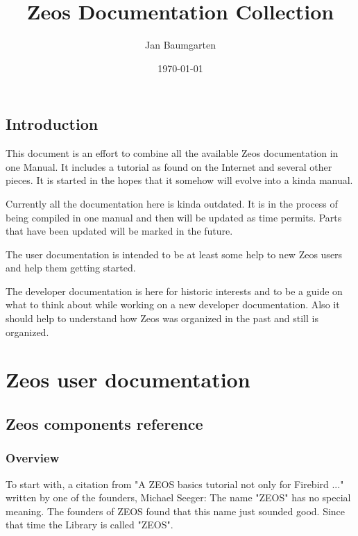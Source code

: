 \documentclass[a4paper,12pt,oneside]{book}
\title{Zeos Documentation Collection}
\author{Jan Baumgarten}
\date{\today}
\begin{document}
\maketitle
\tableofcontents

\chapter{Introduction}
This document is an effort to combine all the available Zeos documentation in one Manual.
It includes a tutorial as found on the Internet and several other pieces.
It is started in the hopes that it somehow will evolve into a kinda manual.

Currently all the documentation here is kinda outdated.
It is in the process of being compiled in one manual and then will be updated as time permits.
Parts that have been updated will be marked in the future.

The user documentation is intended to be at least some help to new Zeos users and help them getting started.

The developer documentation is here for historic interests and to be a guide on what to think about while working on a new developer documentation.
Also it should help to understand how Zeos was organized in the past and still is organized.

\part{Zeos user documentation}

\chapter{Zeos components reference}

\section{Overview}
To start with, a citation from "A ZEOS basics tutorial not only for Firebird ..." written by one of the founders, Michael Seeger:
The name "ZEOS" has no special meaning. The founders of ZEOS found that this name just sounded good.
Since that time the Library is called "ZEOS".
\end{document}
